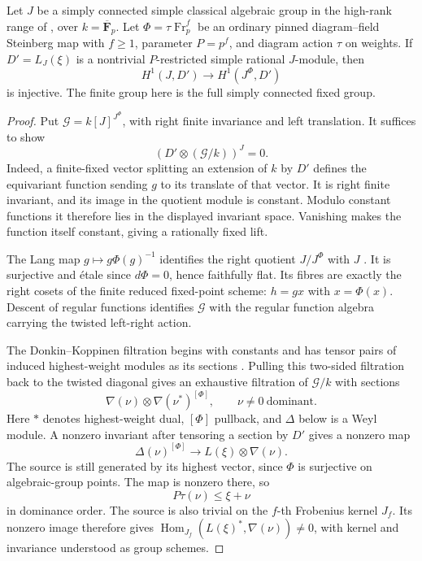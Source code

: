 \begin{lemma}\label{w:h1-injective}
Let $J$ be a simply connected simple classical algebraic group in the
high-rank range of , over
$k=\overline{\mathbf F}_p$. Let
$\Phi=\tau\operatorname{Fr}_p^f$ be an ordinary pinned diagram--field
Steinberg map with $f\ge1$, parameter $P=p^f$, and diagram action $\tau$
on weights. If $D'=L_J(\xi)$ is a nontrivial $P$-restricted simple
rational $J$-module, then
\[
 H^1(J,D')\longrightarrow H^1(J^\Phi,D')
\]
is injective. The finite group here is the full simply connected fixed group.
\end{lemma}
\begin{proof}
Put $\mathcal G=k[J]^{J^\Phi}$, with right finite invariance and left
translation. It suffices to show
\[
 (D'\otimes(\mathcal G/k))^J=0.
\]
Indeed, a finite-fixed vector splitting an extension of $k$ by $D'$
defines the equivariant function sending $g$ to its translate of that
vector. It is right finite invariant, and its image in the quotient
module is constant. Modulo constant functions it therefore lies in the
displayed invariant space. Vanishing makes the function itself constant,
giving a rationally fixed lift.

The Lang map $g\mapsto g\Phi(g)^{-1}$ identifies the right quotient
$J/J^\Phi$ with $J$ \citep{Lang1956,Steinberg1968}
\citep[Definition~17.95 and Theorem~17.96]{Milne2022}.
It is surjective and étale since $d\Phi=0$, hence faithfully flat.
Its fibres are exactly the right cosets of the finite reduced
fixed-point scheme: $h=gx$ with $x=\Phi(x)$. Descent of regular functions
identifies $\mathcal G$ with the regular function algebra carrying the
twisted left-right action.

The Donkin--Koppinen filtration begins with constants and has tensor
pairs of induced highest-weight modules as its sections
\citep[Theorem~4.3 and its preceding construction]{Mathieu2000}
\citep[Section~2.4]{BendelNakanoPillen2011}. Pulling this two-sided
filtration back to the twisted diagonal gives an exhaustive filtration
of $\mathcal G/k$ with sections
\[
 \nabla(\nu)\otimes\nabla(\nu^*)^{[\Phi]},
 \qquad \nu\ne0\ \text{dominant}.
\]
Here $*$ denotes highest-weight dual, $[\Phi]$ pullback, and $\Delta$
below is a Weyl module. A nonzero invariant after tensoring a section
by $D'$ gives a nonzero map
\[
 \Delta(\nu)^{[\Phi]}\longrightarrow L(\xi)\otimes\nabla(\nu).
\]
The source is still generated by its highest vector, since $\Phi$ is
surjective on algebraic-group points. The map is nonzero there, so
\[
 P\tau(\nu)\le\xi+\nu
\]
in dominance order. The source is also trivial on the $f$-th Frobenius
kernel $J_f$. Its nonzero image therefore gives
$\operatorname{Hom}_{J_f}(L(\xi)^*,\nabla(\nu))\ne0$, with kernel
and invariance understood as group schemes.


\end{proof}
